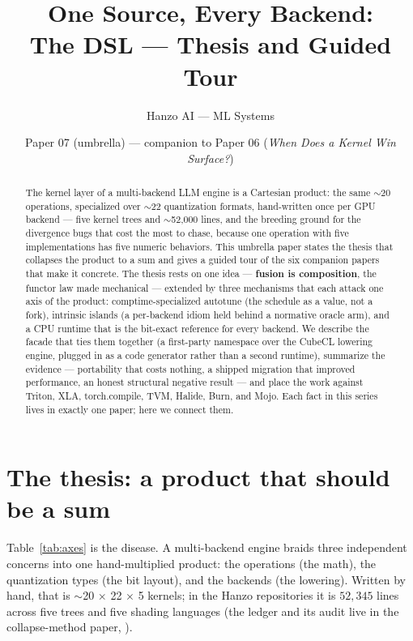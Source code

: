 \documentclass[11pt]{article}
\title{\textbf{One Source, Every Backend:\\ The \hk{} DSL --- Thesis and Guided Tour}}
\author{Hanzo AI --- ML Systems}
\date{Paper 07 (umbrella) --- companion to Paper 06 (\emph{When Does a Kernel Win Surface?})}
\begin{document}
\maketitle

\begin{abstract}
The kernel layer of a multi-backend LLM engine is a Cartesian product: the same $\sim$20 operations,
specialized over $\sim$22 quantization formats, hand-written once per GPU backend --- five kernel trees
and $\sim$52{,}000 lines, and the breeding ground for the divergence bugs that cost the most to chase,
because one operation with five implementations has five numeric behaviors. This umbrella paper states the
thesis that collapses the product to a sum and gives a guided tour of the six companion papers that make
it concrete. The thesis rests on one idea --- \textbf{fusion is composition}, the functor law made
mechanical --- extended by three mechanisms that each attack one axis of the product: comptime-specialized
autotune (the schedule as a value, not a fork), intrinsic islands (a per-backend idiom held behind a
normative oracle arm), and a CPU runtime that is the bit-exact reference for every backend. We describe the
facade that ties them together (a first-party namespace over the CubeCL lowering engine, plugged in as a
code generator rather than a second runtime), summarize the evidence --- portability that costs nothing, a
shipped migration that improved performance, an honest structural negative result --- and place the work
against Triton, XLA, torch.compile, TVM, Halide, Burn, and Mojo. Each fact in this series lives in exactly
one paper; here we connect them.
\end{abstract}

\section{The thesis: a product that should be a sum}
\label{sec:thesis}

Table~\ref{tab:axes} is the disease. A multi-backend engine braids three independent concerns into one
hand-multiplied product: the operations (the math), the quantization types (the bit layout), and the
backends (the lowering). Written by hand, that is $\sim$20 $\times$ 22 $\times$ 5 kernels; in the Hanzo
repositories it is $52{,}345$ lines across five trees and five shading languages (the ledger and its
audit live in the collapse-method paper, \cite{method}).
\end{document}
